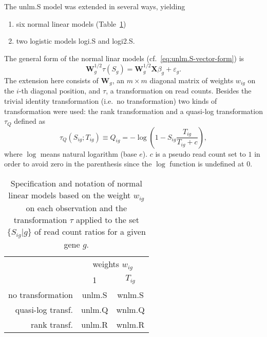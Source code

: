 \documentclass[letterpaper]{article}
\begin{document}
The unlm.S model was extended in several ways, yielding
\begin{enumerate}
\item six normal linear models (Table~\ref{tab:nlm})
\item two logistic models logi.S and logi2.S.
\end{enumerate}

The general form of the normal linar models
(cf.~\ref{eq:unlm.S-vector-form}) is
\begin{equation}
\mathbf{W}_g^{1/2} \tau(S_g) = \mathbf{W}_g^{1/2} \mathbf{X} \beta_g + \varepsilon_g.
\label{eq:nlm-general}
\end{equation}
The extension here consists of \(\mathbf{W}_g\), an \(m\times m\) diagonal matrix of
weights \(w_{ig}\) on the \(i\)-th diagonal position, and \(\tau\), a
transformation on read counts.  Besides the trivial identity transformation
(i.e.~no transformation) two kinds of transformation were used: the rank
transformation and a quasi-log transformation \(\tau_Q\) defined as
\begin{equation}
\tau_Q(S_{ig};T_{ig}) \equiv Q_{ig} = - \log \left( 1 - S_{ig} \frac{T_{ig}}{T_{ig} + c}
\right),
\label{eq:Q}
\end{equation}
where \(\log\) means natural logarithm (base \(e\)).  \(c\) is a pseudo read
count set to \(1\) in order to avoid zero in the parenthesis since the \(\log\)
function is undefined at \(0\).

\begin{table}
\begin{center}
\begin{tabular}{r|cc}
 & \multicolumn{2}{c}{weights \(w_{ig}\)} \\
 & 1 & \(T_{ig}\) \\
\hline
no transformation & unlm.S & wnlm.S \\
quasi-log transf. & unlm.Q & wnlm.Q \\
rank transf. & unlm.R & wnlm.R \\
\end{tabular}
\end{center}
\caption{Specification and notation of normal linear models based on the weight
\(w_{ig}\) on each observation and the
transformation \(\tau\) applied to the set \(\{S_{ig} | g\}\) of read count
ratios for a given gene \(g\).}
\label{tab:nlm}
\end{table}
\end{document}
